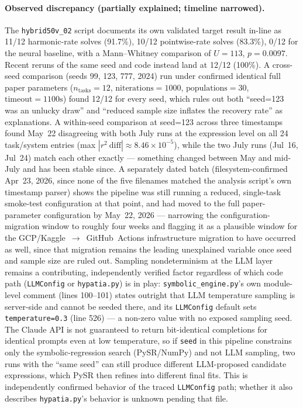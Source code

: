 \paragraph{Observed discrepancy (partially explained; timeline
narrowed).} The \texttt{hybrid50v\_02} script documents its own
validated target result in-line as 11/12 harmonic-rate solves (91.7\%),
10/12 pointwise-rate solves (83.3\%), 0/12 for the neural baseline, with a
Mann--Whitney comparison of $U{=}113$, $p{=}0.0097$. Recent reruns of the
same seed and code instead land at 12/12 (100\%). A cross-seed comparison
(seeds 99, 123, 777, 2024) run under confirmed identical full paper
parameters ($n_{\text{tasks}}{=}12$, $\text{niterations}{=}1000$,
$\text{populations}{=}30$, $\text{timeout}{=}1100\text{s}$) found 12/12
for every seed, which rules out both ``seed=123 was an unlucky draw'' and
``reduced sample size inflates the recovery rate'' as explanations. A
within-seed comparison at seed=123 across three timestamps found May~22
disagreeing with both July runs at the expression level on all 24
task/system entries (max $|r^2\ \text{diff}|\approx 8.46\times10^{-5}$),
while the two July runs (Jul~16, Jul~24) match each other exactly —
something changed between May and mid-July and has been stable since. A
separately dated batch (filesystem-confirmed Apr~23, 2026, since none of
the five filenames matched the analysis script's own timestamp parser)
shows the pipeline was still running a reduced, single-task smoke-test
configuration at that point, and had moved to the full paper-parameter
configuration by May~22, 2026 — narrowing the configuration-migration
window to roughly four weeks and flagging it as a plausible window for
the GCP/Kaggle~$\to$~GitHub~Actions infrastructure migration to have
occurred as well, since that migration remains the leading unexplained
variable once seed and sample size are ruled out. Sampling
nondeterminism at the LLM layer remains a contributing, independently
verified factor regardless of which code path (\texttt{LLMConfig} or
\texttt{hypatia.py}) is in play: \texttt{symbolic\_engine.py}'s own
module-level comment (lines 100–101) states outright that LLM
temperature sampling is server-side and cannot be seeded there, and its
\texttt{LLMConfig} default sets \texttt{temperature=0.3} (line 526) — a
non-zero value with no exposed sampling seed. The Claude API is not
guaranteed to return bit-identical completions for identical prompts even
at low temperature, so if \texttt{seed} in this pipeline constrains only
the symbolic-regression search (PySR/NumPy) and not LLM sampling, two
runs with the ``same seed'' can still produce different LLM-proposed
candidate expressions, which PySR then refines into different final
fits. This is independently confirmed behavior of the traced
\texttt{LLMConfig} path; whether it also describes \texttt{hypatia.py}'s
behavior is unknown pending that file.

